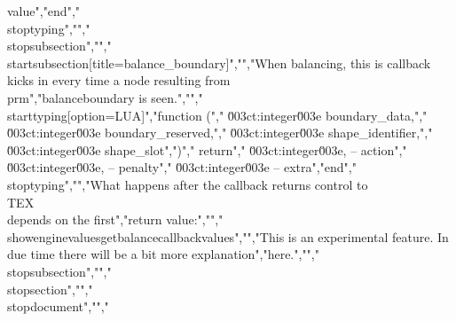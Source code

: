 value","end","\\stoptyping","","\\stopsubsection","","\\startsubsection[title=balance_boundary]","","When balancing, this is callback kicks in every time a node resulting from \\prm","{balanceboundary} is seen.","","\\starttyping[option=LUA]","function (","    \u003ct:integer\u003e boundary_data,","    \u003ct:integer\u003e boundary_reserved,","    \u003ct:integer\u003e shape_identifier,","    \u003ct:integer\u003e shape_slot",")","    return","        \u003ct:integer\u003e, -- action","        \u003ct:integer\u003e, -- penalty","        \u003ct:integer\u003e  -- extra","end","\\stoptyping","","What happens after the callback returns control to \\TEX\\ depends on the first","return value:","","\\showenginevalues{getbalancecallbackvalues}","","This is an experimental feature. In due time there will be a bit more explanation","here.","","\\stopsubsection","","\\stopsection","","\\stopdocument","","%